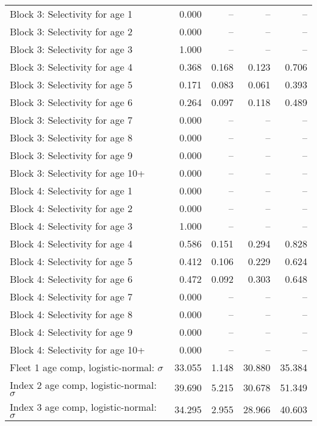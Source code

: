 \documentclass[
]{article}
\begin{document}
\begin{landscape}
\begin{longtable}[t]{lrrrr}
Block 3: Selectivity for age 1 & 0.000 & -- & -- & --\\
Block 3: Selectivity for age 2 & 0.000 & -- & -- & --\\
Block 3: Selectivity for age 3 & 1.000 & -- & -- & --\\
Block 3: Selectivity for age 4 & 0.368 & 0.168 & 0.123 & 0.706\\
\addlinespace
Block 3: Selectivity for age 5 & 0.171 & 0.083 & 0.061 & 0.393\\
Block 3: Selectivity for age 6 & 0.264 & 0.097 & 0.118 & 0.489\\
Block 3: Selectivity for age 7 & 0.000 & -- & -- & --\\
Block 3: Selectivity for age 8 & 0.000 & -- & -- & --\\
Block 3: Selectivity for age 9 & 0.000 & -- & -- & --\\
\addlinespace
Block 3: Selectivity for age 10+ & 0.000 & -- & -- & --\\
Block 4: Selectivity for age 1 & 0.000 & -- & -- & --\\
Block 4: Selectivity for age 2 & 0.000 & -- & -- & --\\
Block 4: Selectivity for age 3 & 1.000 & -- & -- & --\\
Block 4: Selectivity for age 4 & 0.586 & 0.151 & 0.294 & 0.828\\
\addlinespace
Block 4: Selectivity for age 5 & 0.412 & 0.106 & 0.229 & 0.624\\
Block 4: Selectivity for age 6 & 0.472 & 0.092 & 0.303 & 0.648\\
Block 4: Selectivity for age 7 & 0.000 & -- & -- & --\\
Block 4: Selectivity for age 8 & 0.000 & -- & -- & --\\
Block 4: Selectivity for age 9 & 0.000 & -- & -- & --\\
\addlinespace
Block 4: Selectivity for age 10+ & 0.000 & -- & -- & --\\
Fleet 1 age comp, logistic-normal: $\sigma$ & 33.055 & 1.148 & 30.880 & 35.384\\
Index 2 age comp, logistic-normal: $\sigma$ & 39.690 & 5.215 & 30.678 & 51.349\\
Index 3 age comp, logistic-normal: $\sigma$ & 34.295 & 2.955 & 28.966 & 40.603\\*
\end{longtable}
\end{landscape}
\end{document}
